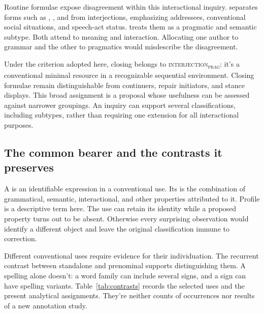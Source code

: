 \documentclass[12pt]{article}
\newcommand{\intj}[1]{\textsc{interjection\textsubscript{#1}}}
\begin{document}
Routine formulae expose disagreement within this interactional inquiry.
\textcite[108--110]{ameka1992} separates forms such as , , and
 from interjections, emphasizing addressees, conventional
social situations, and speech-act status.
\textcite[142]{wilkins1992} treats them as a pragmatic and semantic subtype. Both attend to meaning and interaction. Allocating
one author to grammar and the other to pragmatics would misdescribe the
disagreement.

Under the criterion adopted here, closing  belongs to
\intj{prag}: it's a conventional minimal resource in a recognizable
sequential environment. Closing formulae remain distinguishable from
continuers, repair initiators, and stance displays. This broad assignment
is a proposal whose usefulness can be assessed against narrower groupings.
An inquiry can support several classifications, including subtypes, rather
than requiring one extension for all interactional purposes.

\subsection{The common bearer and the contrasts it preserves}

A  is an identifiable expression in a conventional use.
Its  is the combination of grammatical, semantic, interactional,
and other properties attributed to it. Profile is a descriptive term here.
The use can retain its identity while a proposed property turns out to be
absent. Otherwise every surprising observation would identify a different
object and leave the original classification immune to correction.

Different conventional uses require evidence for their individuation.
The recurrent contrast between standalone and prenominal 
supports distinguishing them. A spelling alone doesn't: a word family can
include several signs, and a sign can have spelling variants. Table~\ref{tab:contrasts}
records the selected uses and the present analytical assignments. They're
neither counts of occurrences nor results of a new annotation study.
\end{document}
